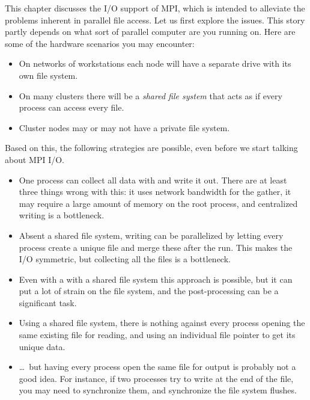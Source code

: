 

This chapter discusses the I/O support of MPI, which is intended
to alleviate the problems inherent in parallel file access.
Let us first explore the issues.
This story partly depends on what sort of parallel
computer are you running on.
Here are some of the hardware scenarios you may encounter:

\begin{itemize}
\item On networks of workstations each node will have a separate
  drive with its own file system.
\item On many clusters there will be a
  \emph{shared file system}
  that acts as if every process can access every file.
\item Cluster nodes may or may not have a private file system.
\end{itemize}

Based on this, the following strategies are possible, even before
we start talking about MPI I/O.

\begin{itemize}
\item One process can collect all data with 
  and write it out. There are at least three things wrong with this:
  it uses network bandwidth for the gather, it may require a large
  amount of memory on the root process, and centralized writing
  is a bottleneck.
\item Absent a shared file system, writing can be parallelized by letting
  every process create a unique file and merge these after the run.
  This makes the I/O symmetric, but collecting all the files is a bottleneck.
\item Even with a with a shared file system this approach is possible,
  but it can put a lot of strain
  on the file system, and the post-processing can be a significant task.
\item Using a shared file system,
  there is nothing against every process opening the same existing file
  for reading, and using an individual file pointer to get its unique
  data.
\item \ldots~but having every process open the same file for output is
  probably not a good idea. For instance, if two processes try to write
  at the end of the file, you may need to synchronize them, and synchronize
  the file system flushes.
\end{itemize}

